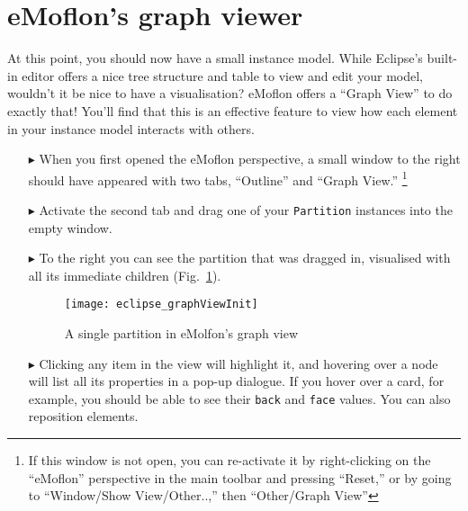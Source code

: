 \newpage
\section{eMoflon's graph viewer}
\genHeader

At this point, you should now have a small instance model. While Eclipse's built-in editor offers a nice tree structure and table to view and edit your model,
wouldn't it be nice to have a visualisation? eMoflon offers a ``Graph View'' to do exactly that! You'll find that this is an effective
feature to view how each element in your instance model interacts with others.

\begin{itemize}

\item[$\blacktriangleright$] When you first opened the eMoflon perspective, a small window to the right should have appeared with two tabs, ``Outline'' and
``Graph View.'' \footnote{If this window is not open, you can re-activate it by right-clicking on the ``eMoflon'' perspective in the main toolbar and pressing
``Reset,'' or by going to ``Window/Show View/Other..,'' then ``Other/Graph View''} 

\item[$\blacktriangleright$] Activate the second tab and drag one of your \texttt{Partition} instances into the empty window. 

\item[$\blacktriangleright$] To the right you can see the partition that was dragged in, visualised with all its immediate children
(Fig.~\ref{fig:graphView_init}).

\vspace{0.5cm}

\begin{figure}[htbp]
	\centering
  \texttt{[image: eclipse\_graphViewInit]}
	\caption{A single partition in eMolfon's graph view}
	\label{fig:graphView_init}
\end{figure}

\vspace{0.5cm}

\item[$\blacktriangleright$] Clicking any item in the view will highlight it, and hovering over a node will list all its properties in a pop-up dialogue. If you
hover over a card, for example, you should be able to see their \texttt{back} and \texttt{face} values. You can also reposition elements.

\clearpage


\end{itemize}
